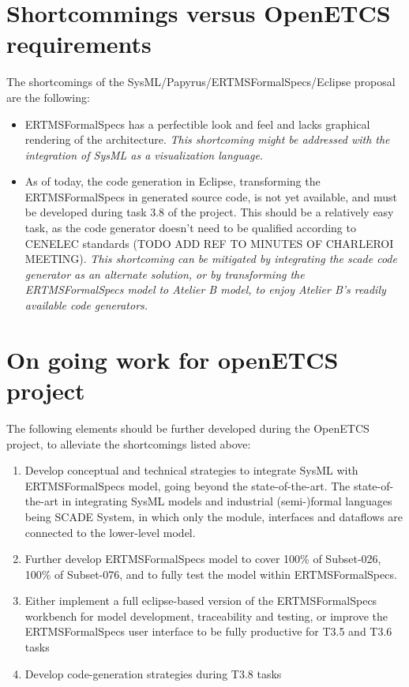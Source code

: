 \section{Shortcommings versus OpenETCS requirements}

The shortcomings of the SysML/Papyrus/ERTMSFormalSpecs/Eclipse proposal are the following:

\begin{itemize}
	\item ERTMSFormalSpecs has a perfectible look and feel and lacks graphical rendering of the architecture. \emph{This shortcoming might be addressed with the integration of SysML as a visualization language.}
	\item As of today, the code generation in Eclipse, transforming the ERTMSFormalSpecs in generated source code, is not yet available, and must be developed during task 3.8 of the project. This should be a relatively easy task, as the code generator doesn't need to be qualified according to CENELEC standards (TODO ADD REF TO MINUTES OF CHARLEROI MEETING). \emph{This shortcoming can be mitigated by integrating the scade code generator as an alternate solution, or by transforming the ERTMSFormalSpecs model to Atelier B model, to enjoy Atelier B's readily available code generators.}
\end{itemize}

\section{On going work for openETCS project}

The following elements should be further developed during the OpenETCS project, to alleviate the shortcomings listed above:

\begin{enumerate}
  \item Develop conceptual and technical strategies to integrate SysML with ERTMSFormalSpecs model, going beyond the state-of-the-art. The state-of-the-art in integrating SysML models and industrial (semi-)formal languages being SCADE System, in which only the module, interfaces and dataflows are connected to the lower-level model.
	\item Further develop ERTMSFormalSpecs model to cover 100\% of Subset-026, 100\% of Subset-076, and to fully test the model within ERTMSFormalSpecs. 
	\item Either implement a full eclipse-based version of the ERTMSFormalSpecs workbench for model development, traceability and testing, or improve the ERTMSFormalSpecs user interface to be fully productive for T3.5 and T3.6 tasks
	\item Develop code-generation strategies during T3.8 tasks
\end{enumerate}

